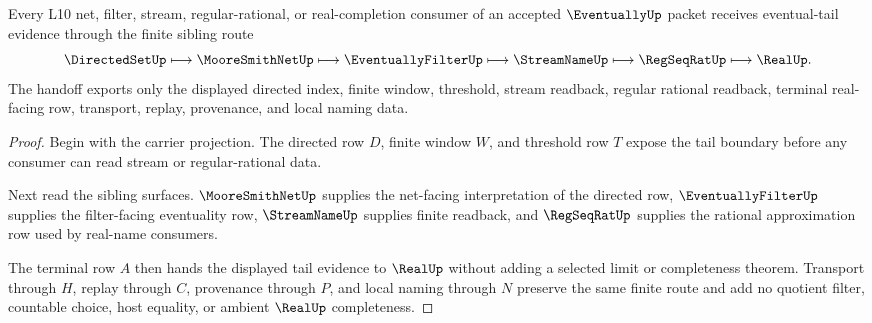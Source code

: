 \begin{theorem}
\label{thm:eventually-directed-tail-handoff}
Every L10 net, filter, stream, regular-rational, or real-completion consumer of an accepted $\EventuallyUp$ packet receives eventual-tail evidence through the finite sibling route
$$
\DirectedSetUp
\longmapsto
\MooreSmithNetUp
\longmapsto
\EventuallyFilterUp
\longmapsto
\StreamNameUp
\longmapsto
\RegSeqRatUp
\longmapsto
\RealUp .
$$
The handoff exports only the displayed directed index, finite window, threshold, stream readback, regular rational readback, terminal real-facing row, transport, replay, provenance, and local naming data.
\end{theorem}
\begin{proof}
Begin with the carrier projection. The directed row $D$, finite window $W$, and threshold row $T$ expose the tail boundary before any consumer can read stream or regular-rational data.

Next read the sibling surfaces. $\MooreSmithNetUp$ supplies the net-facing interpretation of the directed row, $\EventuallyFilterUp$ supplies the filter-facing eventuality row, $\StreamNameUp$ supplies finite readback, and $\RegSeqRatUp$ supplies the rational approximation row used by real-name consumers.

The terminal row $A$ then hands the displayed tail evidence to $\RealUp$ without adding a selected limit or completeness theorem. Transport through $H$, replay through $C$, provenance through $P$, and local naming through $N$ preserve the same finite route and add no quotient filter, countable choice, host equality, or ambient $\RealUp$ completeness.
\end{proof}


\begin{closurestatus}{\EventuallyUp}
  \theoryclosure{\seedClosure}
  \formalstatus{\unformalizedV}
\end{closurestatus}
